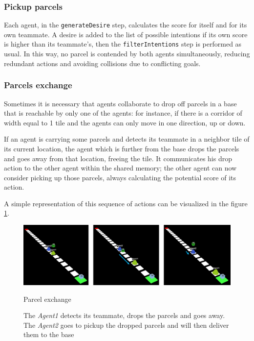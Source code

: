\subsubsection*{Pickup parcels}
Each agent, in the \texttt{generateDesire} step, calculates the score for itself and for its own teammate. A desire is added to the list of possible intentions if its own score is higher than its teammate's, then the \texttt{filterIntentions} step is performed as usual. In this way, no parcel is contended by both agents simultaneously, reducing redundant actions and avoiding collisions due to conflicting goals.


\subsubsection*{Parcels exchange}
Sometimes it is necessary that agents collaborate to drop off parcels in a base that is reachable by only one of the agents: for instance, if there is a corridor of width equal to 1 tile and the agents can only move in one direction, up or down.

If an agent is carrying some parcels and detects its teammate in a neighbor tile of its current location, the agent which is further from the base drops the parcels and goes away from that location, freeing the tile. It communicates his drop action to the other agent within the shared memory; the other agent can now consider picking up those parcels, always calculating the potential score of its action.

A simple representation of this sequence of actions can be visualized in the figure \ref{fig:exchange}.

\begin{figure}
    \centering
    \includegraphics[width=\linewidth]{Images/exchange.png}
    \caption{Parcel exchange}
    \captionsetup{font=footnotesize}
    \caption*{The \textit{Agent1} detects its teammate, drops the parcels and goes away. The \textit{Agent2} goes to pickup the dropped parcels and will then deliver them to the base}
    \label{fig:exchange}
\end{figure}

